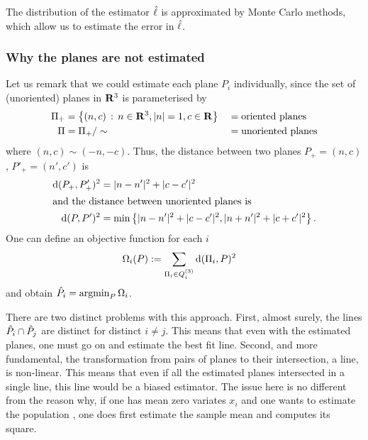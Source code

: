 \documentclass[a4paper,reqno]{amsart}
\begin{document}
The distribution of the estimator $\hat{\ell}$ is approximated by
Monte Carlo methods, which allow us to estimate the error in
$\hat{\ell}$.

\subsubsection{Why the planes are not estimated}
\label{sec:why-no-planes}

Let us remark that we could estimate each plane $P_i$ individually,
since the set of (unoriented) planes in ${\mathbf R}^3$ is parameterised by
\begin{align}
  \label{eq:planes-in-r3}
  \Pi_+ &= \left\{ (n,c) \,:\, n\in{\mathbf R}^3,|n|=1, c\in{\mathbf R} \right\}
  &&=\textrm{oriented planes}\\
  \Pi &= \Pi_+/\sim
  &&=\textrm{unoriented planes}
\end{align}
where $(n,c) \sim (-n,-c)$. Thus, the distance between two planes
$P_+=(n,c)$, $P'_+=(n',c')$ is
\begin{align}
  \label{eq:dplane}
  {\mathrm d}(P_+,P'_+)^2 &= |n-n'|^2 + |c-c'|^2\\
\intertext{and the distance between unoriented planes is}
  {\mathrm d}(P,P')^2 &= \min\left\{ |n-n'|^2 + |c-c'|^2,  |n+n'|^2
    + |c+c'|^2 \right\}.
\end{align}
One can define an objective function for each $i$
\begin{align}
  \label{eq:plane-objectivefn}
  \Omega_i(P) &:= \sum_{\Pi_i \in Q_i^{(3)}} {\mathrm d}(\Pi_i,P)^2
\end{align}
and obtain $\hat{P}_i={\displaystyle\mathrm{argmin}_{P}\,\Omega_i}$.

There are two distinct problems with this approach. First, almost
surely, the lines $\hat{P}_i \cap \hat{P}_j$ are distinct
for distinct $i \neq j$. This means that even with the estimated
planes, one must go on and estimate the best fit line. Second, and
more fundamental, the transformation from pairs of planes to their
intersection, a line, is non-linear. This means that even if all the
estimated planes intersected in a single line, this line would be a
biased estimator. The issue here is no different from the reason why,
if one has mean zero variates $x_i$ and one wants to estimate the
population , one does first estimate the sample mean
and computes its square.
\end{document}
